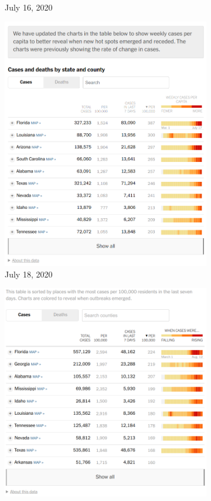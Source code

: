 \documentclass[article]{jdssv}\usepackage[]{graphicx}\usepackage[]{xcolor}
\begin{document}
\begin{figure}
\begin{subfigure}[t]{.25\textwidth}
\caption{July 16, 2020}\label{fig:nyt-colors2}
\end{subfigure}\hfill
\begin{subfigure}[t]{.25\textwidth}
\includegraphics[width=\textwidth]{nyt-wayback-20200718}
\caption{July 18, 2020}\label{fig:nyt-colors3}
\end{subfigure}\hfill
\begin{subfigure}[t]{.25\textwidth}
\includegraphics[width=\textwidth]{nyt-wayback-20200814}

\end{subfigure}
\end{figure}
\end{document}
